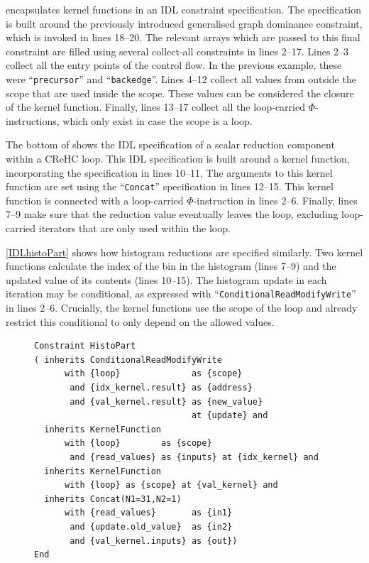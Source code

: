      encapsulates kernel functions in an IDL constraint
    specification.
    The specification is built around the previously introduced generalised
    graph dominance constraint, which is invoked in lines 18--20.
    The relevant arrays which are passed to this final constraint are filled
    using several collect-all constraints in lines 2--17.
    Lines 2--3 collect all the entry points of the control flow.
    In the previous example, these were ``{\tt precursor}'' and
    ``{\tt backedge}''.
    Lines 4--12 collect all values from outside the scope that are used inside
    the scope.
    These values can be considered the closure of the kernel function.
    Finally, lines 13--17 collect all the loop-carried $\Phi$-instructions,
    which only exist in case the scope is a loop.

    The bottom of  shows the IDL specification of a
    scalar reduction component within a CReHC loop.
    This IDL specification is built around a kernel function, incorporating the
    specification in lines 10--11.
    The arguments to this kernel function are set using the ``{\tt Concat}''
    specification in lines 12--15.
    This kernel function is connected with a loop-carried $\Phi$-instruction in
    lines 2--6.
    Finally, lines 7--9 make sure that the reduction value eventually leaves the
    loop, excluding loop-carried iterators that are only used within the loop.

    \autoref{IDLhistoPart} shows how histogram reductions are specified
    similarly.
    Two kernel functions calculate the index of the bin in the histogram
    (lines 7--9) and the updated value of its contents (lines 10--15).
    The histogram update in each iteration may be conditional, as expressed with
    ``{\tt ConditionalReadModifyWrite}'' in lines 2--6.
    Crucially, the kernel functions use the scope of the loop and already
    restrict this conditional to only depend on the allowed values.

\begin{figure}[H]
\begin{lstlisting}[language=IDL,label={IDLhistoPart},caption=
   {IDL specification of a histogram reduction within a complex reduction and
    histogram computation:
    Two kernel functions are present: lines 7--9 calculate the index into the
    histogram array, lines 10--11 generate the updated value.
    The read-modify-write step may be conditional.}]
Constraint HistoPart
( inherits ConditionalReadModifyWrite
      with {loop}              as {scope}
       and {idx_kernel.result} as {address}
       and {val_kernel.result} as {new_value}
                               at {update} and
  inherits KernelFunction
      with {loop}        as {scope}
       and {read_values} as {inputs} at {idx_kernel} and
  inherits KernelFunction
      with {loop} as {scope} at {val_kernel} and
  inherits Concat(N1=31,N2=1)
      with {read_values}       as {in1}
       and {update.old_value}  as {in2}
       and {val_kernel.inputs} as {out})
End
\end{lstlisting}
\end{figure}


